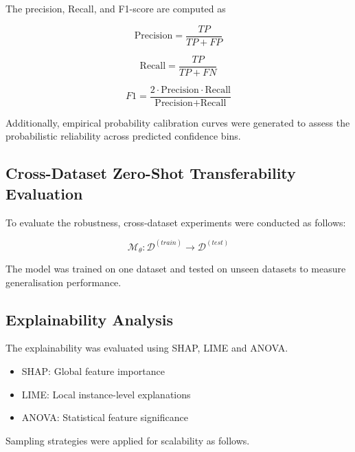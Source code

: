 \documentclass[a4paper,fleqn]{cas-sc}
\begin{document}
The precision, Recall, and F1-score are computed as

\begin{equation}
\text{Precision} = \frac{TP}{TP + FP}
\end{equation}

\begin{equation}
\text{Recall} = \frac{TP}{TP + FN}
\end{equation}

\begin{equation}
F1 = \frac{2 \cdot \text{Precision} \cdot \text{Recall}}{\text{Precision} + \text{Recall}}
\end{equation}

Additionally, empirical probability calibration curves were generated to assess the probabilistic reliability across predicted confidence bins.



\subsection{Cross-Dataset Zero-Shot Transferability Evaluation}

To evaluate the robustness, cross-dataset experiments were conducted as follows:

\begin{equation}
\mathcal{M}_\theta : \mathcal{D}^{(train)} \rightarrow \mathcal{D}^{(test)}
\end{equation}

The model was trained on one dataset and tested on unseen datasets to measure generalisation performance.



\subsection{Explainability Analysis}

The explainability was evaluated using SHAP, LIME and ANOVA.

\begin{itemize}
    \item SHAP: Global feature importance
    \item LIME: Local instance-level explanations
    \item ANOVA: Statistical feature significance
\end{itemize}

Sampling strategies were applied for scalability as follows.
\end{document}
